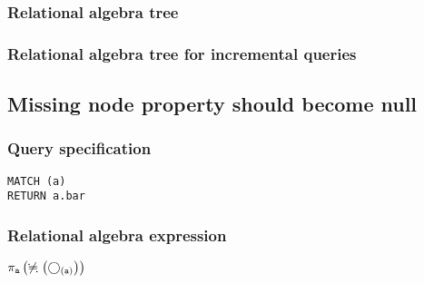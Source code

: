 \subsubsection*{Relational algebra tree}


\subsubsection*{Relational algebra tree for incremental queries}


\subsection{Missing node property should become null}

\subsubsection*{Query specification}

\begin{lstlisting}
MATCH (a)
RETURN a.bar
\end{lstlisting}

\subsubsection*{Relational algebra expression}

$\projection{\var{a}} \left(\alldifferent{} \left(\getvertices{a}{}\right)\right)$

